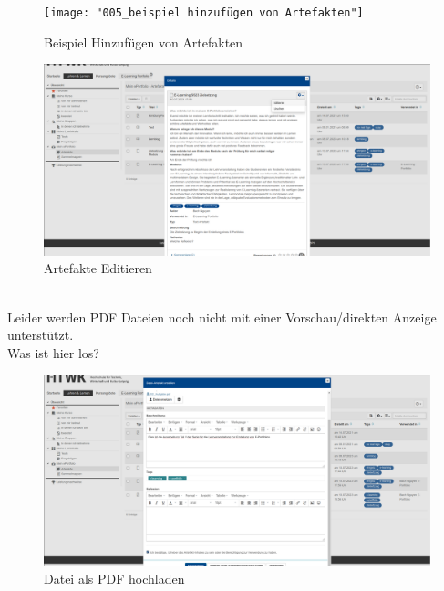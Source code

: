 \documentclass[a4paper,oneside]{scrarticle}
\begin{document}
	\begin{figure}[h]
		\centering
		\texttt{[image: "005\_beispiel hinzufügen von Artefakten"]}
		\caption{Beispiel Hinzufügen von Artefakten}
		\label{fig:005beispiel-hinzufugen-von-artefakten}
	\end{figure}
	\begin{figure}[h]
		\centering
		\includegraphics[width=0.8\linewidth]{006_ArtefakteEditieren}
		\caption{Artefakte Editieren}
		\label{fig:006artefakteeditieren}
	\end{figure}\\
	Leider werden PDF Dateien noch nicht mit einer Vorschau/direkten Anzeige unterstützt.\\
	Was ist hier los?
	\begin{figure}[h]
		\centering
		\includegraphics[width=0.8\linewidth]{007_ArtefakteHinzufugen}
		\caption{Datei als PDF hochladen}
		\label{fig:007artefaktehinzufugen}
	\end{figure}
	
	
\end{document}
